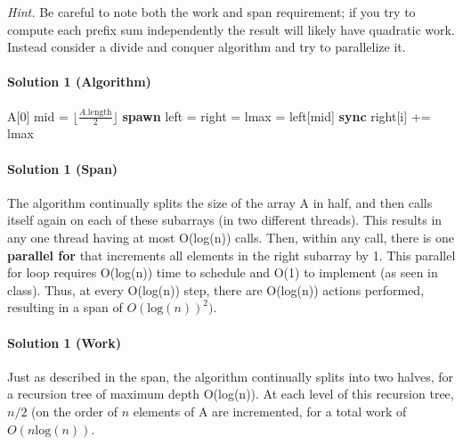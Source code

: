 \documentclass[11pt]{article}
\begin{document}
\textit{Hint.} Be careful to note both the work and span requirement; if you try to compute each prefix sum independently the result will likely have quadratic work. Instead consider a divide and conquer algorithm and try to parallelize it. 


\paragraph{Solution 1 (Algorithm)}

\begin{algorithmic}[1]
            \State \Return A[0]
        \EndIf
        \State mid = $\lfloor \frac{A.\text{length}}{2} \rfloor$
        \State \textbf{spawn} left = 
        \State right = 
        \State lmax = left[mid]
        \State \textbf{sync}
            \State right[i] += lmax
        \EndFor
        \State \Return {}
    \EndProcedure
\end{algorithmic}

\paragraph{Solution 1 (Span)}

The  algorithm continually splits the size of the array A in half, and then calls itself again on each of these subarrays (in two different threads). This results in any one thread having at most O(log(n)) calls. Then, within any call, there is one \textbf{parallel for} that increments all elements in the right subarray by 1. This parallel for loop requires O(log(n)) time to schedule and O(1) to implement (as seen in class). Thus, at every O(log(n)) step, there are O(log(n)) actions performed, resulting in a span of $O(\text{log}(n))^2)$.

\paragraph{Solution 1 (Work)}

Just as described in the span, the  algorithm continually splits into two halves, for a recursion tree of maximum depth O(log(n)). At each level of this recursion tree, $n / 2$ (on the order of $n$ elements of A are incremented, for a total work of $O(n \text{log}(n))$.
\end{document}
